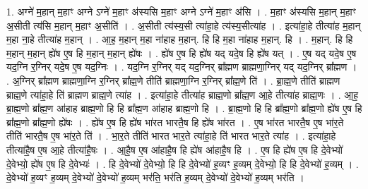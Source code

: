 \documentclass[17pt]{extarticle}
\begin{document}
1. अग्ने॑ म॒हान् म॒हाꣳ अग्ने ऽग्ने॑ म॒हाꣳ अ॑स्यसि म॒हाꣳ अग्ने ऽग्ने॑ म॒हाꣳ अ॑सि । . म॒हाꣳ अ॑स्यसि म॒हान् म॒हाꣳ अ॒सीती त्य॑सि म॒हान् म॒हाꣳ अ॒सीति॑ । . अ॒सीती त्य॑स्य॒सी त्या॑हा॒हे त्य॑स्य॒सीत्या॑ह । . इत्या॑हा॒हे तीत्या॑ह म॒हान् म॒हा ना॒हे तीत्या॑ह म॒हान् । . आ॒ह॒ म॒हान् म॒हा ना॑हाह म॒हान्. हि हि म॒हा ना॑हाह म॒हान्. हि । . म॒हान्. हि हि म॒हान् म॒हान् ह्ये॑ष ए॒ष हि म॒हान् म॒हान् ह्ये॑षः । . ह्ये॑ष ए॒ष हि ह्ये॑ष यद् यदे॒ष हि ह्ये॑ष यत् । . ए॒ष यद् यदे॒ष ए॒ष यद॒ग्नि र॒ग्निर् यदे॒ष ए॒ष यद॒ग्निः । . यद॒ग्नि र॒ग्निर् यद् यद॒ग्निर् ब्रा᳚ह्मण ब्राह्मणा॒ग्निर् यद् यद॒ग्निर् ब्रा᳚ह्मण । . अ॒ग्निर् ब्रा᳚ह्मण ब्राह्मणा॒ग्नि र॒ग्निर् ब्रा᳚ह्म॒णे तीति॑ ब्राह्मणा॒ग्नि र॒ग्निर् ब्रा᳚ह्म॒णे ति॑ । . ब्रा॒ह्म॒णे तीति॑ ब्राह्मण ब्राह्म॒णे त्या॑हा॒हे ति॑ ब्राह्मण ब्राह्म॒णे त्या॑ह । . इत्या॑हा॒हे तीत्या॑ह ब्राह्म॒णो ब्रा᳚ह्म॒ण आ॒हे तीत्या॑ह ब्राह्म॒णः । . आ॒ह॒ ब्रा॒ह्म॒णो ब्रा᳚ह्म॒ण आ॑हाह ब्राह्म॒णो हि हि ब्रा᳚ह्म॒ण आ॑हाह ब्राह्म॒णो हि । . ब्रा॒ह्म॒णो हि हि ब्रा᳚ह्म॒णो ब्रा᳚ह्म॒णो ह्ये॑ष ए॒ष हि ब्रा᳚ह्म॒णो ब्रा᳚ह्म॒णो ह्ये॑षः । . ह्ये॑ष ए॒ष हि ह्ये॑ष भा॑रत भारतै॒ष हि ह्ये॑ष भा॑रत । . ए॒ष भा॑रत भारतै॒ष ए॒ष भा॑र॒ते तीति॑ भारतै॒ष ए॒ष भा॑र॒ते ति॑ । . भा॒र॒ते तीति॑ भारत भार॒ते त्या॑हा॒हे ति॑ भारत भार॒ते त्या॑ह । . इत्या॑हा॒हे तीत्या॑है॒ष ए॒ष आ॒हे तीत्या॑है॒षः । . आ॒है॒ष ए॒ष आ॑हाहै॒ष हि ह्ये॑ष आ॑हाहै॒ष हि । . ए॒ष हि ह्ये॑ष ए॒ष हि दे॒वेभ्यो॑ दे॒वेभ्यो॒ ह्ये॑ष ए॒ष हि दे॒वेभ्यः॑ । . हि दे॒वेभ्यो॑ दे॒वेभ्यो॒ हि हि दे॒वेभ्यो॑ ह॒व्यꣳ ह॒व्यम् दे॒वेभ्यो॒ हि हि दे॒वेभ्यो॑ ह॒व्यम् । . दे॒वेभ्यो॑ ह॒व्यꣳ ह॒व्यम् दे॒वेभ्यो॑ दे॒वेभ्यो॑ ह॒व्यम् भर॑ति॒ भर॑ति ह॒व्यम् दे॒वेभ्यो॑ दे॒वेभ्यो॑ ह॒व्यम् भर॑ति । \newline
\end{document}
